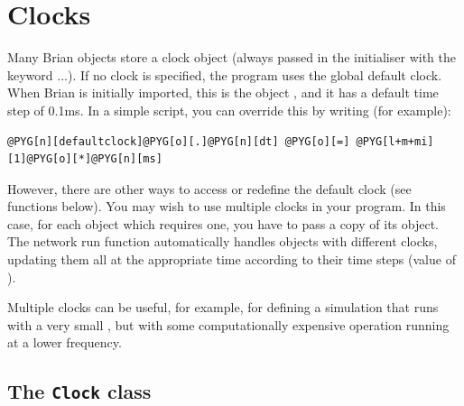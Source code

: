 \documentclass[letterpaper,10pt,english]{manual}
\begin{document}
\hypertarget{index-83}{}\section{Clocks}
Many Brian objects store a clock object (always passed in the
initialiser with the keyword ...). If no clock is specified,
the program uses the global default clock. When Brian is initially
imported, this is the object \hyperlink{brian.defaultclock}{}, and it has a default
time step of 0.1ms. In a simple script, you can override this by
writing (for example):

\begin{Verbatim}[commandchars=@\[\]]
@PYG[n][defaultclock]@PYG[o][.]@PYG[n][dt] @PYG[o][=] @PYG[l+m+mi][1]@PYG[o][*]@PYG[n][ms]
\end{Verbatim}

However, there are other ways to access or redefine the default
clock (see functions below).
You may wish to use multiple clocks in your program. In this case,
for each object which requires one, you have to pass a copy of its
\hyperlink{brian.Clock}{} object. The network run function automatically handles objects
with different clocks, updating them all at the appropriate time
according to their time steps (value of \hyperlink{brian.Clock.dt}{}).

Multiple clocks can be useful, for example, for defining a simulation
that runs with a very small , but with some computationally
expensive operation running at a lower frequency.


\subsection{The \texttt{Clock} class}
\end{document}
